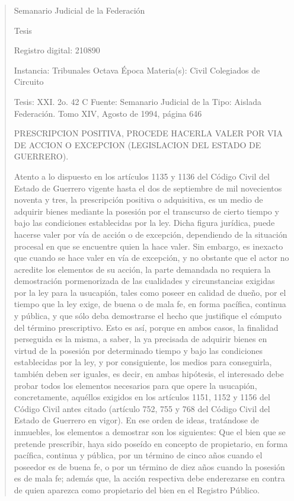 \documentclass[11pt,a4paper]{article}
\begin{document}
\begin{quote}
                                                   Semanario Judicial de la Federación

                                                  Tesis

 Registro digital: 210890

 Instancia: Tribunales            Octava Época                          Materia(s): Civil
 Colegiados de Circuito

 Tesis: XXI. 2o. 42 C             Fuente: Semanario Judicial de la      Tipo: Aislada
                                  Federación.
                                  Tomo XIV, Agosto de 1994, página
                                  646


PRESCRIPCION POSITIVA, PROCEDE HACERLA VALER POR VIA DE ACCION O EXCEPCION
(LEGISLACION DEL ESTADO DE GUERRERO).


Atento a lo dispuesto en los artículos 1135 y 1136 del Código Civil del Estado de Guerrero vigente
hasta el dos de septiembre de mil novecientos noventa y tres, la prescripción positiva o adquisitiva,
es un medio de adquirir bienes mediante la posesión por el transcurso de cierto tiempo y bajo las
condiciones establecidas por la ley. Dicha figura jurídica, puede hacerse valer por vía de acción o de
excepción, dependiendo de la situación procesal en que se encuentre quien la hace valer. Sin
embargo, es inexacto que cuando se hace valer en vía de excepción, y no obstante que el actor no
acredite los elementos de su acción, la parte demandada no requiera la demostración
pormenorizada de las cualidades y circunstancias exigidas por la ley para la usucapión, tales como
poseer en calidad de dueño, por el tiempo que la ley exige, de buena o de mala fe, en forma
pacífica, continua y pública, y que sólo deba demostrarse el hecho que justifique el cómputo del
término prescriptivo. Esto es así, porque en ambos casos, la finalidad perseguida es la misma, a
saber, la ya precisada de adquirir bienes en virtud de la posesión por determinado tiempo y bajo las
condiciones establecidas por la ley, y por consiguiente, los medios para conseguirla, también deben
ser iguales, es decir, en ambas hipótesis, el interesado debe probar todos los elementos necesarios
para que opere la usucapión, concretamente, aquéllos exigidos en los artículos 1151, 1152 y 1156
del Código Civil antes citado (artículo 752, 755 y 768 del Código Civil del Estado de Guerrero en
vigor). En ese orden de ideas, tratándose de inmuebles, los elementos a demostrar son los
siguientes: Que el bien que se pretende prescribir, haya sido poseído en concepto de propietario, en
forma pacífica, continua y pública, por un término de cinco años cuando el poseedor es de buena fe,
o por un término de diez años cuando la posesión es de mala fe; además que, la acción respectiva
debe enderezarse en contra de quien aparezca como propietario del bien en el Registro Público.


\end{quote}
\end{document}
